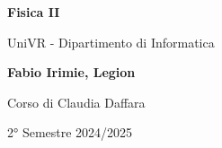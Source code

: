 \begin{titlepage}
	\begin{center}
		\vspace*{1cm}

		\Huge
		\textbf{Fisica II}

		\vspace{0.5cm}
		\LARGE
		UniVR - Dipartimento di Informatica

		\vspace{1.5cm}

		\textbf{Fabio Irimie, Legion}

		\vfill


		\vspace{0.8cm}

    Corso di Claudia Daffara

		2° Semestre 2024/2025

	\end{center}
\end{titlepage}
